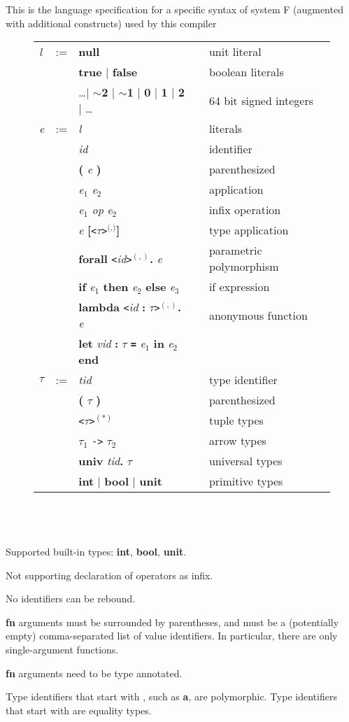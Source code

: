 \documentclass[12pt]{article}
\author{Andrey Yao}
\newcommand{\gm}[1]{\textit{#1}} %
\newcommand{\kw}[1]{\textbf{#1}} %
\newcommand{\hd}[1]{ \gm{#1} & := }
\newcommand{\mt}[1]{\texttt{<}#1\texttt{>}}
\newcommand{\row}[2]{ & #1 &  & #2\\}
\newcommand{\newrow}[2]{ & &#1 & &#2\\}
\begin{document}
This is the language specification for a specific syntax of system F (augmented with additional constructs) used by this compiler
\\
\begin{figure}[h]
  \centering
\begin{tabular}{l l l l l}
  \hline
  \hd{l}
  \row{\kw{null}}{unit literal}
  \newrow{\kw{true} $|$ \kw{false}}{boolean literals}
  \newrow{\dots $|$ \kw{$\sim$2} $|$ \kw{$\sim$1} $|$ \kw{0} $|$ \kw{1} $|$ \kw{2} $|$ \dots}{64 bit signed integers}
  \hd{e} %
  \row{\gm{l}}{literals}
  \newrow{\gm{id}}{identifier}
  \newrow{\kw{(} \gm{e} \kw{)}}{parenthesized}
  \newrow{\gm{e}$_1$ \gm{e}$_2$}{application}
  \newrow{\gm{e}$_1$ \gm{op} \gm{e}$_2$}{infix operation}
  \newrow{\gm{e} \kw{[}\mt{$\tau$}$^\kw{(,)}$\kw{]}}{type application}
  \newrow{\kw{forall} \mt{\gm{id}}$^{(,)}$\kw{.} \gm{e}}{parametric polymorphism}
  \newrow{\kw{if} \gm{e}$_1$ \kw{then} \gm{e}$_2$ \kw{else} \gm{e}$_3$}{if expression}
  \newrow{\kw{lambda} \mt{\gm{id} \kw{:} $\tau$}$^{(,)}$\kw{.} \gm{e}}{anonymous function}
  \newrow{\kw{let} \gm{vid} \kw{:} $\tau$ \kw{\texttt{=}} \gm{e}$_1$ \kw{in} \gm{e}$_2$ \kw{end}}{}
  \hline
  \hd{$\tau$}
  \row{\gm{tid}}{type identifier}
  \newrow{\kw{(} $\tau$ \kw{)}}{parenthesized}
  \newrow{\mt{$\tau$}$^{(*)}$}{tuple types}
  \newrow{$\tau_1$ \texttt{->} $\tau_2$}{arrow types}
  \newrow{\kw{univ} \gm{tid}\kw{.} $\tau$}{universal types}
  \newrow{\kw{int} $|$ \kw{bool} $|$ \kw{unit}}{primitive types}
  \hline
\end{tabular}
\end{figure}
\\\\\\

Supported built-in types: \kw{int}, \kw{bool}, \kw{unit}.

Not supporting declaration of operators as infix.

No identifiers can be rebound.

\kw{fn} arguments must be surrounded by parentheses, and must be a (potentially empty) comma-separated list of value identifiers. In particular, there are only single-argument functions.

\kw{fn} arguments need to be type annotated.

Type identifiers that start with \kw{\textquotesingle}, such as \kw{\textquotesingle a}, are polymorphic. Type identifiers that start with \kw{\textquotesingle\textquotesingle} are equality types.
 
\end{document}
